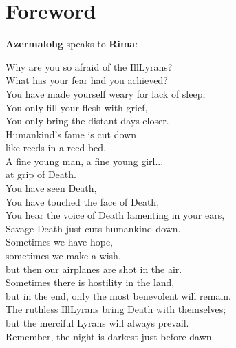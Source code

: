 \documentclass[12pt,a4paper]{memoir}
\theoremstyle{definition}
\begin{document}
\section*{Foreword}
\Large
\textbf{Azermalohg} speaks to \textbf{Rima}:
\begin{displayquote}
	Why are you so afraid of the IllLyrans?\\
	What has your fear had you achieved?\\
	You have made yourself weary for lack of sleep,\\
	You only fill your flesh with grief,\\
	You only bring the distant days closer.\\
	Humankind's fame is cut down\\
	like reeds in a reed-bed.\\
	A fine young man, a fine young girl...\\
	 at grip of Death.\\
	You have seen Death,\\
	You have touched the face of Death,\\
	You hear the voice of Death lamenting in your ears,\\
	Savage Death just cuts humankind down.\\
	Sometimes we have hope,\\
	sometimes we make a wish,\\
	but then our airplanes are shot in the air.\\
	Sometimes there is hostility in the land,\\
	but in the end, only the most benevolent will remain.\\
	The ruthless IllLyrans bring Death with themselves;\\
	but the merciful Lyrans will always prevail.\\
	Remember, the night is darkest just before dawn.
\end{displayquote}


\newpage
\end{document}
